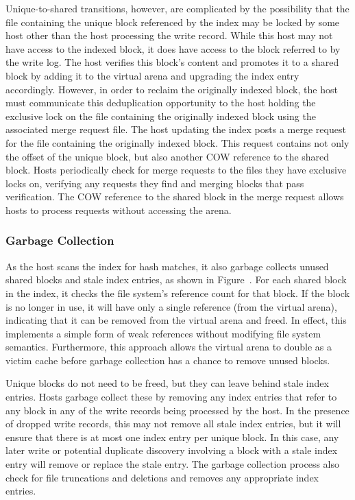 Unique-to-shared transitions, however, are complicated by the
possibility that the file containing the
unique block referenced by the index may be locked by some host other
than the host processing the write record.  While this host
may not have access to the indexed block, it does
have access to the block referred to by the write log.  The host
verifies this
block's content and promotes it to a shared block by adding it to the
virtual arena and upgrading the index entry accordingly.  However, in
order to reclaim the originally indexed block, the host must
communicate this deduplication opportunity to the host holding the
exclusive lock on the file containing the originally indexed block
using the associated merge request file.  The host updating
the index posts a merge request for the file containing the originally
indexed block.  This request contains not only
the offset of the unique block, but also another COW reference to the
shared block.  Hosts periodically check for merge requests to the files
they have exclusive locks on, verifying any requests they
find and merging blocks that pass verification.  The COW
reference to the shared block in the merge request allows hosts to
process requests without accessing the arena.


\subsubsection{Garbage Collection}

As the host scans the index for hash matches, it also
garbage collects unused shared blocks and stale index entries, as
shown in Figure~.  For each 
shared block in the index, it checks the file system's reference count
for that block.  If the block is no longer in use, it will have only a
single reference (from the virtual arena), indicating that it can be removed
from the virtual arena and freed.  In effect, this implements a simple form of
weak references without modifying file system semantics.  Furthermore,
this approach allows the virtual arena to double as a victim cache before
garbage collection has a chance to remove unused blocks.

Unique blocks do not need to be freed, but they can leave behind stale
index entries.  Hosts garbage collect these by removing any index entries
that refer to any block in any of the write records being processed by
the host.  In the presence of dropped write records, this may not remove
all stale index entries, but it will ensure that there is at most one
index entry per unique block.  In this case, any later write or potential
duplicate discovery involving a block with a stale index entry will
remove or replace the stale entry.  The garbage collection process
also check for file truncations and deletions and removes any
appropriate index entries.




